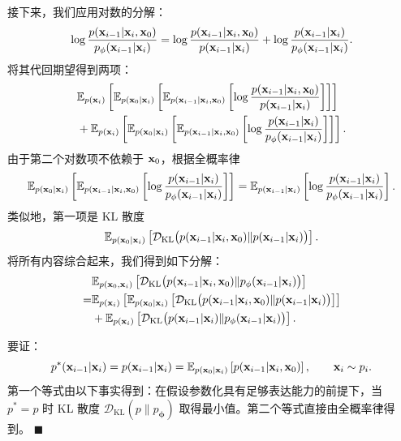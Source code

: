接下来，我们应用对数的分解：
\begin{align*}
    \log \frac{p({\mathbf{x}}_{i-1}|{\mathbf{x}}_i, {\mathbf{x}}_0)}{p_\phi({\mathbf{x}}_{i-1}|{\mathbf{x}}_i)}
    =\log \frac{p({\mathbf{x}}_{i-1}|{\mathbf{x}}_i, {\mathbf{x}}_0)}{p({\mathbf{x}}_{i-1}|{\mathbf{x}}_i)} 
    + \log \frac{p({\mathbf{x}}_{i-1}|{\mathbf{x}}_i)}{p_\phi({\mathbf{x}}_{i-1}|{\mathbf{x}}_i)}.
\end{align*}
将其代回期望得到两项：
\begin{align*}
    &\mathbb{E}_{p({\mathbf{x}}_i)} \left[
    \mathbb{E}_{p({\mathbf{x}}_0|{\mathbf{x}}_i)} \left[
    \mathbb{E}_{p({\mathbf{x}}_{i-1}|{\mathbf{x}}_i, {\mathbf{x}}_0)} \left[
    \log \frac{p({\mathbf{x}}_{i-1}|{\mathbf{x}}_i, {\mathbf{x}}_0)}{p({\mathbf{x}}_{i-1}|{\mathbf{x}}_i)}
    \right]
    \right]
    \right]
    \\
    &+
    \mathbb{E}_{p({\mathbf{x}}_i)} \left[
    \mathbb{E}_{p({\mathbf{x}}_0|{\mathbf{x}}_i)} \left[
    \mathbb{E}_{p({\mathbf{x}}_{i-1}|{\mathbf{x}}_i, {\mathbf{x}}_0)} \left[
    \log \frac{p({\mathbf{x}}_{i-1}|{\mathbf{x}}_i)}{p_\phi({\mathbf{x}}_{i-1}|{\mathbf{x}}_i)}
    \right]
    \right]
    \right].
\end{align*}
由于第二个对数项不依赖于 ${\mathbf{x}}_0$，根据全概率律
\begin{align*}
    \mathbb{E}_{p({\mathbf{x}}_0|{\mathbf{x}}_i)} \left[
    \mathbb{E}_{p({\mathbf{x}}_{i-1}|{\mathbf{x}}_i, {\mathbf{x}}_0)} \left[
    \log \frac{p({\mathbf{x}}_{i-1}|{\mathbf{x}}_i)}{p_\phi({\mathbf{x}}_{i-1}|{\mathbf{x}}_i)}
    \right]
    \right]
    = \mathbb{E}_{p({\mathbf{x}}_{i-1}|{\mathbf{x}}_i)} \left[
    \log \frac{p({\mathbf{x}}_{i-1}|{\mathbf{x}}_i)}{p_\phi({\mathbf{x}}_{i-1}|{\mathbf{x}}_i)}
    \right].
\end{align*}
类似地，第一项是 KL 散度
\begin{align*}
    \mathbb{E}_{p({\mathbf{x}}_0|{\mathbf{x}}_i)} \left[
    \mathcal{D}_{\text{KL}} \big(p({\mathbf{x}}_{i-1}|{\mathbf{x}}_i, {\mathbf{x}}_0)  \|  p({\mathbf{x}}_{i-1}|{\mathbf{x}}_i)\big)
    \right].
\end{align*}
将所有内容综合起来，我们得到如下分解：
\begin{align*}
    &\mathbb{E}_{p({\mathbf{x}}_0, {\mathbf{x}}_i)} \left[
    \mathcal{D}_{\text{KL}} \big(p({\mathbf{x}}_{i-1}|{\mathbf{x}}_i, {\mathbf{x}}_0)  \|  p_\phi({\mathbf{x}}_{i-1}|{\mathbf{x}}_i)\big)
    \right]
    \\
    =& \mathbb{E}_{p({\mathbf{x}}_i)} \left[
    \mathbb{E}_{p({\mathbf{x}}_0|{\mathbf{x}}_i)} \left[
    \mathcal{D}_{\text{KL}} \big(p({\mathbf{x}}_{i-1}|{\mathbf{x}}_i, {\mathbf{x}}_0)  \|  p({\mathbf{x}}_{i-1}|{\mathbf{x}}_i)\big)
    \right]
    \right]
    \\
    &+
    \mathbb{E}_{p({\mathbf{x}}_i)} \left[
    \mathcal{D}_{\text{KL}} \big(p({\mathbf{x}}_{i-1}|{\mathbf{x}}_i)  \|  p_\phi({\mathbf{x}}_{i-1}|{\mathbf{x}}_i)\big)
    \right].
\end{align*}

 要证：
\[
p^*({\mathbf{x}}_{i-1}|{\mathbf{x}}_i)
=
p({\mathbf{x}}_{i-1}|{\mathbf{x}}_i)
=
\mathbb{E}_{p({\mathbf{x}}_0|{\mathbf{x}}_i)}
\left[
p({\mathbf{x}}_{i-1}|{\mathbf{x}}_i,{\mathbf{x}}_0)
\right],
\qquad
{\mathbf{x}}_i \sim p_i.
\]
第一个等式由以下事实得到：在假设参数化具有足够表达能力的前提下，当 $p^* = p$ 时 KL 散度 $\mathcal{D}_{\mathrm{KL}}(p \| p_{\bm{\phi}})$ 取得最小值。第二个等式直接由全概率律得到。
\hfill$\blacksquare$



